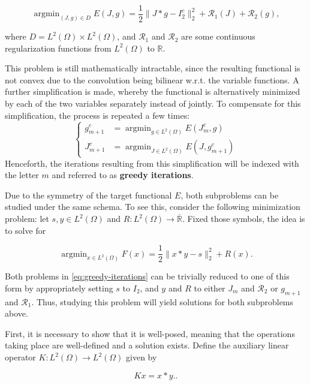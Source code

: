 \documentclass[twocolumn,twoside,a4paper,10pt]{IEEEtran}
\DeclareMathOperator*{\argmin}{\operatorname*{argmin}}
\DeclareMathOperator*{\argmin}{arg\,min}
\begin{document}
\begin{equation}\label{eq:full-I2-functional}
  \argmin_{(J, g)\in D} E(J, g) = \frac12\|J\ast g - I_2^c\|_2^2 + \mathcal{R}_1(J) + \mathcal{R}_2(g),
\end{equation}

where \(D = L^2(\Omega)\times L^2(\Omega)\), and \(\mathcal{R}_1\) and \(\mathcal{R}_2\) are some continuous regularization functions from \(L^2(\Omega)\) to \(\mathbb{R}\). 

This problem is still mathematically intractable, since the resulting functional is not convex due to the convolution being bilinear w.r.t. the variable functions. A further simplification is made, whereby the functional is alternatively minimized by each of the two variables separately instead of jointly. To compensate for this simplification, the process is repeated a few times:
\begin{equation}\label{eq:greedy-iterations}
  \left\{\begin{split}
    g_{m+1}^c &= \argmin_{g\in L^2(\Omega)} E(J_m^c, g) \\
    J_{m+1}^c &= \argmin_{J\in L^2(\Omega)} E(J, g_{m+1}^c)
  \end{split}\right.
\end{equation}
Henceforth, the iterations resulting from this simplification will be indexed with the letter \(m\) and referred to as \textbf{greedy iterations}.

Due to the symmetry of the target functional \(E\), both subproblems can be studied under the same schema. To see this, consider the following minimization problem: let \(s, y\in L^2(\Omega)\) and \(R\colon L^2(\Omega)\to\overline{\mathbb{R}}\). Fixed those symbols, the idea is to solve for

\[
  \argmin_{x\in L^2(\Omega)}F(x) = \frac12\|x\ast y - s\|_2^2 + R(x)
.\]

Both problems in \cref{eq:greedy-iterations} can be trivially reduced to one of this form by appropriately setting \(s\) to \(I_2\), and \(y\) and \(R\) to either \(J_m\) and \(\mathcal{R}_2\) or \(g_{m+1}\) and \(\mathcal{R}_1\). Thus, studying this problem will yield solutions for both subproblems above.

First, it is necessary to show that it is well-posed, meaning that the operations taking place are well-defined and a solution exists. Define the auxiliary linear operator \(K\colon L^2(\Omega)\to L^2(\Omega)\) given by

\[
  Kx=x\ast y.
.\]
\end{document}
